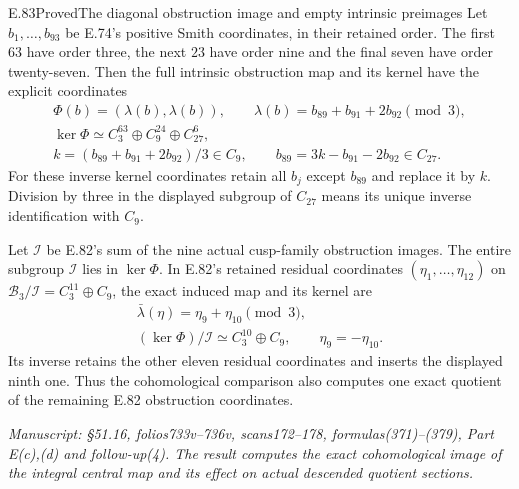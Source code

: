 \begin{statement}{E.83}{Proved}{The diagonal obstruction image and empty intrinsic preimages}
Let $b_1,\ldots,b_{93}$ be E.74's positive Smith
coordinates, in their retained order. The first
$63$ have order three, the next $23$ have order
nine and the final seven have order twenty-seven.
Then the full intrinsic obstruction map and its
kernel have the explicit coordinates
\[
 \begin{gathered}
 \Phi(b)=(\lambda(b),\lambda(b)),\qquad
 \lambda(b)=b_{89}+b_{91}+2b_{92}\pmod3,\\
 \ker\Phi\simeq C_3^{63}\oplus C_9^{24}\oplus C_{27}^6,\\
 k=(b_{89}+b_{91}+2b_{92})/3\in C_9,\qquad
 b_{89}=3k-b_{91}-2b_{92}\in C_{27}.
 \end{gathered}
 \tag{E83.13}
\]
For these inverse kernel coordinates retain all
$b_j$ except $b_{89}$ and replace it by $k$.
Division by three in the displayed subgroup of
$C_{27}$ means its unique inverse identification
with $C_9$.

Let $\mathscr I$ be E.82's sum of the nine actual
cusp-family obstruction images. The entire
subgroup $\mathscr I$ lies in $\ker\Phi$.
In E.82's retained residual coordinates
$(\eta_1,\ldots,\eta_{12})$ on
$\mathcal B_3/\mathscr I=C_3^{11}\oplus C_9$,
the exact induced map and its kernel are
\[
 \begin{gathered}
 \bar\lambda(\eta)=\eta_9+\eta_{10}\pmod3,\\
 (\ker\Phi)/\mathscr I\simeq C_3^{10}\oplus C_9,
       \qquad \eta_9=-\eta_{10}.
 \end{gathered}
 \tag{E83.14}
\]
Its inverse retains the other eleven residual
coordinates and inserts the displayed ninth one.
Thus the cohomological comparison also computes
one exact quotient of the remaining E.82
obstruction coordinates.

\emph{Manuscript: \S51.16, folios733v--736v,
scans172--178, formulas(371)--(379), Part E(c),(d)
and follow-up(4). The result computes the exact
cohomological image of the integral central map
and its effect on actual descended quotient
sections.}
\end{statement}

